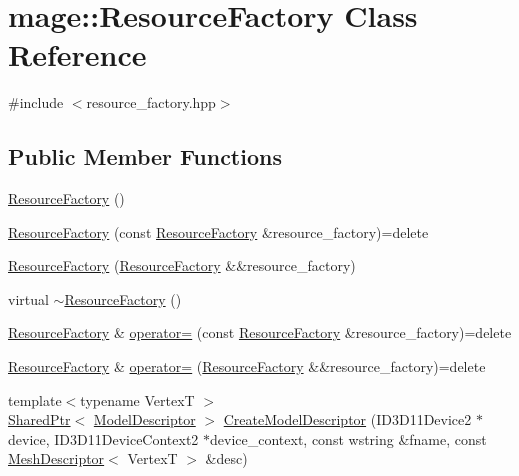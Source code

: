 \hypertarget{classmage_1_1_resource_factory}{}\section{mage\+:\+:Resource\+Factory Class Reference}
\label{classmage_1_1_resource_factory}


{\ttfamily \#include $<$resource\+\_\+factory.\+hpp$>$}

\subsection*{Public Member Functions}
\begin{DoxyCompactItemize}
\item 
\hyperlink{classmage_1_1_resource_factory_a340bde81096427e319b60063ae771a0d}{Resource\+Factory} ()
\item 
\hyperlink{classmage_1_1_resource_factory_ac2d236ed7dc16f4ab87d9d8e95d78a94}{Resource\+Factory} (const \hyperlink{classmage_1_1_resource_factory}{Resource\+Factory} \&resource\+\_\+factory)=delete
\item 
\hyperlink{classmage_1_1_resource_factory_a492a4d018530a7e5dcdb3f7a2800b252}{Resource\+Factory} (\hyperlink{classmage_1_1_resource_factory}{Resource\+Factory} \&\&resource\+\_\+factory)
\item 
virtual \hyperlink{classmage_1_1_resource_factory_a58764dea5d6cd05405bd62366cc25681}{$\sim$\+Resource\+Factory} ()
\item 
\hyperlink{classmage_1_1_resource_factory}{Resource\+Factory} \& \hyperlink{classmage_1_1_resource_factory_a1a99724dd744fde5ce2a1488966b30d0}{operator=} (const \hyperlink{classmage_1_1_resource_factory}{Resource\+Factory} \&resource\+\_\+factory)=delete
\item 
\hyperlink{classmage_1_1_resource_factory}{Resource\+Factory} \& \hyperlink{classmage_1_1_resource_factory_a4a1a0c064f068329f4b94c47ec17046f}{operator=} (\hyperlink{classmage_1_1_resource_factory}{Resource\+Factory} \&\&resource\+\_\+factory)=delete
\item 
{\footnotesize template$<$typename VertexT $>$ }\\\hyperlink{namespacemage_a1e01ae66713838a7a67d30e44c67703e}{Shared\+Ptr}$<$ \hyperlink{classmage_1_1_model_descriptor}{Model\+Descriptor} $>$ \hyperlink{classmage_1_1_resource_factory_ae27d9c780713784afcd02726ce959b8c}{Create\+Model\+Descriptor} (I\+D3\+D11\+Device2 $\ast$device, I\+D3\+D11\+Device\+Context2 $\ast$device\+\_\+context, const wstring \&fname, const \hyperlink{structmage_1_1_mesh_descriptor}{Mesh\+Descriptor}$<$ VertexT $>$ \&desc)

\end{DoxyCompactItemize}

